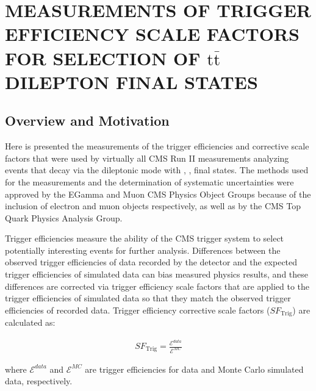 
\chapter{MEASUREMENTS OF TRIGGER EFFICIENCY SCALE FACTORS FOR SELECTION OF \ensuremath{\mathrm{t\bar{t}}} DILEPTON FINAL STATES}
\label{Trigger_Efficiency_Scale_Factors}

\section{Overview and Motivation}
Here is presented the measurements of the trigger efficiencies and corrective scale factors that were used by virtually all CMS Run II measurements analyzing \ttbar events that decay via the dileptonic mode with \ee, \emu, \mumu final states.  
The methods used for the measurements and the determination of systematic uncertainties were approved by the EGamma and Muon CMS Physics Object Groups because of the inclusion of electron and muon objects respectively, as well as by the CMS Top Quark Physics Analysis Group.

Trigger efficiencies measure the ability of the CMS trigger system to select potentially interesting events for further analysis.
Differences between the observed trigger efficiencies of data recorded by the detector and the expected trigger efficiencies of simulated data can bias measured physics results, and these differences are corrected via trigger efficiency scale factors that are applied to the trigger efficiencies of simulated data so that they match the observed trigger efficiencies of recorded data.
Trigger efficiency corrective scale factors ($SF_{\text{Trig}}$) are calculated as:
\begin{linenomath*}
\begin{align}
SF_{\text{Trig}} = \frac{\mathcal{E}^{data}}{\mathcal{E}^{MC}}
\label{SF}
\end{align}
\end{linenomath*}
where $\mathcal{E}^{data}$ and $\mathcal{E}^{MC}$ are trigger efficiencies for data and Monte Carlo simulated data, respectively.

